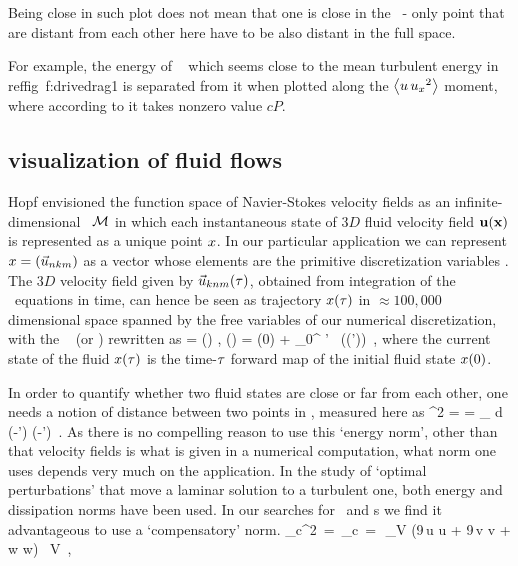 Being close in such plot
does not mean that one is close in the \statesp\ - only point that are
distant from each other here have to be also distant in the full space.

For example, the energy of \reqva\  which
seems close to the
mean turbulent energy in reffig~{f:drivedrag1} is separated
from it when plotted along the
$\left\langle {u \, u_{x}{}^2} \right\rangle$ moment, where according to
 it takes nonzero value $c P$.


\subsection{{\StateDsp} visualization of fluid flows}
\label{s:visualStatSp}

Hopf envisioned the function space of {Navier-Stokes} velocity fields as
an infinite-dimensional \statesp\ ${\cal M}$ in which each instantaneous state
of $3D$ fluid velocity field ${\bf u}({\bf x})$ is represented as a unique point
$x$. In our particular application we can represent $x =
(\vec{u}_{nkm})$ as a vector whose elements are the primitive
discretization variables . The $3D$ velocity field given
by $\vec{u}_{knm}(\tau)$, obtained from integration of the \NS\
equations in time, can hence be seen as trajectory $x(\tau)$ in
$\approx 100,000$ dimensional space spanned by the free variables of our
numerical discretization, with the \NSe\ \refeq{NSvorticEq}
(or \KSe)
rewritten as
\beq
   \dot{\ssp} = \vel(\ssp) ,
   \qquad
   \ssp(\zeit) = \ssp(0)
            + \int_0^\zeit \! \zeit' \, \vel(\ssp(\zeit'))
\,,
where the current state of the fluid $ x(\tau)$ is the time-$\tau$
forward map of the initial fluid state  $x(0)$.

In order to quantify whether two fluid states are close or far from each
other, one needs a notion of distance between two points in \statesp,
measured here as
\beq
  ^2  =  =
\int_\bCell \! d \bx \;
(-\vec{u}') \cdot (-')
\,.
As there is no compelling reason to use this {`energy norm'}, other than
that velocity fields is what is given in a numerical computation, what
norm one uses depends very much on the application. In the study of
`optimal perturbations' that move a laminar solution to a turbulent one,
both energy\rf{TeHaHe10} and dissipation\rf{LoCaCoPeGo11} norms
have been used.  In our searches for \reqva\ and \rpo s
we find it advantageous to use a `compensatory' norm.
\beq
   _c^2 \,=\, _c
   \,=\, \,\int_V (9\,u \cdot u + 9\,v \cdot v + w \cdot w)
        \, \mathrm{d}V
\,,

